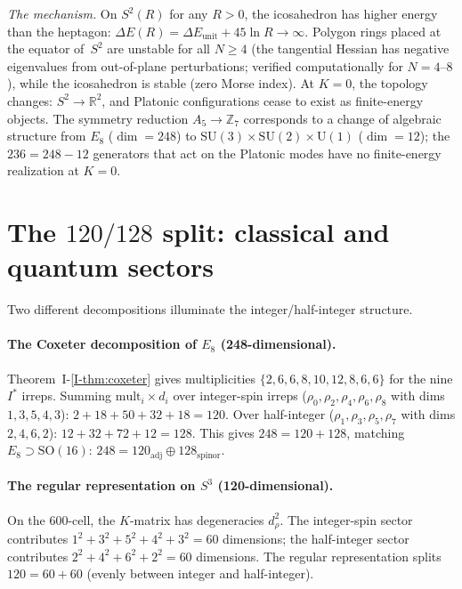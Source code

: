 \emph{The mechanism.}\enspace
On $S^2(R)$ for any $R > 0$, the icosahedron has higher energy
than the heptagon:
$\Delta E(R) = \Delta E_{\mathrm{unit}} + 45\ln R \to \infty$.
Polygon rings placed at the equator of~$S^2$ are unstable for all
$N \ge 4$ (the tangential Hessian has negative eigenvalues from
out-of-plane perturbations; verified computationally for $N = 4$--$8$),
while the icosahedron is stable (zero Morse index).
At $K = 0$, the topology changes: $S^2 \to \mathbb{R}^2$, and
Platonic configurations cease to exist as finite-energy objects.
The symmetry reduction $A_5 \to \mathbb{Z}_7$ corresponds
to a change of algebraic structure from $E_8$ ($\dim = 248$) to
$\mathrm{SU}(3) {\times} \mathrm{SU}(2) {\times} \mathrm{U}(1)$
($\dim = 12$); the $236 = 248 - 12$ generators that act on the
Platonic modes have no finite-energy realization at $K = 0$.

\section{The $120/128$ split: classical and quantum sectors}
\label{sec:split}

Two different decompositions illuminate the integer/half-integer
structure.

\paragraph{The Coxeter decomposition of $E_8$ (248-dimensional).}
Theorem~I-\ref{I-thm:coxeter} gives multiplicities
$\{2, 6, 6, 8, 10, 12, 8, 6, 6\}$ for the nine $I^*$ irreps.
Summing $\mathrm{mult}_i \times d_i$ over integer-spin irreps
($\rho_0, \rho_2, \rho_4, \rho_6, \rho_8$ with dims $1,3,5,4,3$):
$2 + 18 + 50 + 32 + 18 = 120$.
Over half-integer ($\rho_1, \rho_3, \rho_5, \rho_7$ with dims $2,4,6,2$):
$12 + 32 + 72 + 12 = 128$.
This gives $248 = 120 + 128$, matching $E_8 \supset \mathrm{SO}(16)$:
$248 = 120_{\mathrm{adj}} \oplus 128_{\mathrm{spinor}}$.

\paragraph{The regular representation on $S^3$ (120-dimensional).}
On the 600-cell, the $K$-matrix has degeneracies $d_\rho^2$.
The integer-spin sector contributes
$1^2 + 3^2 + 5^2 + 4^2 + 3^2 = 60$ dimensions;
the half-integer sector contributes
$2^2 + 4^2 + 6^2 + 2^2 = 60$ dimensions.
The regular representation splits $120 = 60 + 60$
(evenly between integer and half-integer).

